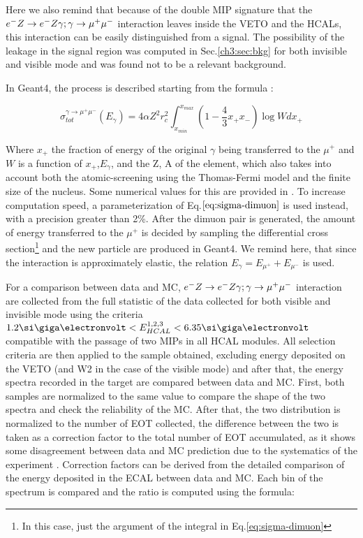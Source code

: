 Here we also remind that because of the double MIP signature that the $e^- Z \to e^- Z \gamma; \gamma \to \mu^+ \mu^-$ interaction leaves inside the VETO and the HCALs, this interaction can be easily distinguished from a signal. The possibility of the leakage in the signal region was computed in Sec.\ref{ch3:sec:bkg} for both invisible and visible mode and was found not to be a relevant background.

In Geant4, the process is described starting from the formula \cite{dimuon-mc}:

\begin{equation}
  \label{eq:sigma-dimuon}
  \sigma_{tot}^{\gamma \to \mu^+ \mu^-}(E_{\gamma}) = 4\alpha Z^2 r^2_c\int^{x_{max}}_{x_{min}} \left(1 - \frac{4}{3}x_+x_- \right) \log{W}dx_+
\end{equation}

Where $x_+$ the fraction of energy of the original $\gamma$ being transferred to the $\mu^+$ and $W$ is a function of $x_+$,$E_{\gamma}$, and the Z, A of the element, which also takes into account both the atomic-screening using the Thomas-Fermi model and the finite size of the nucleus. Some numerical values for this are provided in \cite{dimuon-mc}. To increase computation speed, a parameterization of Eq.$\ref{eq:sigma-dimuon}$ is used instead, with a precision greater than 2\%. After the dimuon pair is generated, the amount of energy transferred to the $\mu^+$ is decided by sampling the differential cross section\footnote{In this case, just the argument of the integral in Eq.\ref{eq:sigma-dimuon}} and the new particle are produced in Geant4. We remind here, that since the interaction is approximately elastic, the relation $E_{\gamma} = E_{\mu^+} + E_{\mu^-}$ is used.

For a comparison between data and MC, $e^- Z \to e^- Z \gamma; \gamma \to \mu^+ \mu^-$ interaction are collected from the full statistic of the data collected for both visible and invisible mode using the criteria $1.2 \gev < E_{HCAL}^{1,2,3} < 6.35 \gev$ compatible with the passage of two MIPs in all HCAL modules. All selection criteria are then applied to the sample obtained, excluding energy deposited on the VETO (and W2 in the case of the visible mode) and after that, the energy spectra recorded in the target are compared between data and MC. First, both samples are normalized to the same value to compare the shape of the two spectra and check the reliability of the MC. After that, the two distribution is normalized to the number of EOT collected, the difference between the two is taken as a correction factor to the total number of EOT accumulated, as it shows some disagreement between data and MC prediction due to the systematics of the experiment \cite{na64-prd}. Correction factors can be derived from the detailed comparison of the energy deposited in the ECAL between data and MC. Each bin of the spectrum is compared and the ratio is computed using the formula:

